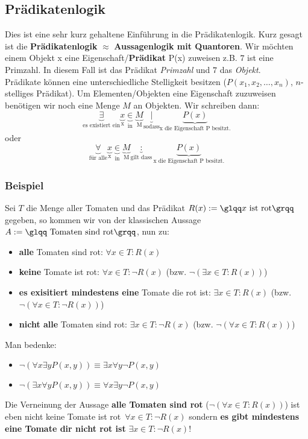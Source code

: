 \subsection{Prädikatenlogik}
Dies ist eine sehr kurz gehaltene Einführung in die Prädikatenlogik. Kurz gesagt ist die \textbf{Prädikatenlogik} \textbf{$\approx$} \textbf{Aussagenlogik mit Quantoren}. Wir möchten einem Objekt x eine Eigenschaft/\textbf{Prädikat} P(x) zuweisen z.B. \glqq$7$ ist eine Primzahl\grqq . In diesem Fall ist das Prädikat \textit{Primzahl} und $7$ das \textit{Objekt}.\\
Prädikate können eine unterschiedliche Stelligkeit besitzen ($P(x_1, x_2, \ldots, x_n)$, $n$-stelliges Prädikat). Um Elementen/Objekten eine Eigenschaft zuzuweisen benötigen wir noch eine Menge $M$ an Objekten. Wir schreiben dann:
\begin{equation*}
\underbrace{\exists}_{\text{es existiert ein}} \underbrace{x}_{\text{x}} \underbrace{\in}_{\text{in}} \underbrace{M}_{\text{M}} \underbrace{|}_{\text{sodass}} \underbrace{P(x)}_{\text{x die Eigenschaft P besitzt.}}
\end{equation*}
oder
\begin{equation*}
\underbrace{\forall}_{\text{für alle}} \underbrace{x}_{\text{x}} \underbrace{\in}_{\text{in}} \underbrace{M}_{\text{M}} \underbrace{:}_{\text{gilt dass}} \underbrace{P(x)}_{\text{x die Eigenschaft P besitzt.}}
\end{equation*}

\subsubsection*{Beispiel}
Sei $T$ die Menge aller Tomaten und das Prädikat $R(x):= \text{\glqq}x \text{ ist rot\grqq}$ gegeben, so kommen wir von der klassischen Aussage $A := \text{\glqq Tomaten sind rot\grqq}$, nun zu:
\begin{itemize}
\item \glqq\textbf{alle} Tomaten sind rot\grqq : $\forall x \in T : R(x)$
\item \glqq\textbf{keine} Tomate ist rot\grqq : $\forall x \in T : \neg R(x)$ (bzw. $\neg (\exists x \in T : R(x))$)
\item \glqq\textbf{es exisitiert mindestens eine} Tomate die rot ist\grqq : $\exists x \in T : R(x)$ (bzw. $\neg (\forall x \in T : \neg R(x))$)
\item \glqq\textbf{nicht alle} Tomaten sind rot\grqq : $\exists x \in T : \neg R(x)$ (bzw. $\neg (\forall x \in T : R(x))$)
\end{itemize}
Man bedenke:
\begin{itemize}
\item $ \neg (\forall x \exists y P(x, y)) \equiv \exists x \forall y \neg P(x, y)$
\item $ \neg (\exists x \forall y P(x, y)) \equiv \forall x \exists y \neg P(x, y)$
\end{itemize}
Die Verneinung der Aussage \textbf{\glqq alle Tomaten sind rot\grqq} ($\neg (\forall x \in T : R(x))$) ist eben nicht \glqq keine Tomate ist rot\grqq \ $\forall x \in T : \neg R(x)$ sondern \textbf{\glqq es gibt mindestens eine Tomate dir nicht rot ist\grqq} $ \exists x \in T : \neg R(x)$!

